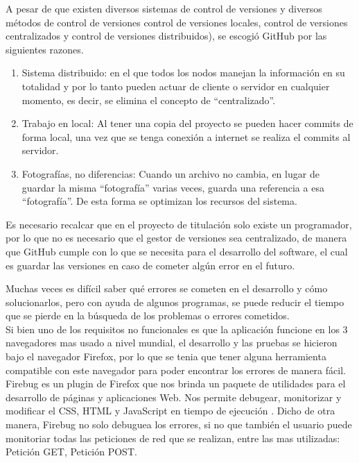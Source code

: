 	 A pesar de que existen diversos sistemas de control de versiones y diversos métodos  de control de versiones control de versiones locales, control de versiones centralizados y control de versiones distribuidos), se escogió GitHub por las siguientes razones.
	 
	 \begin{enumerate}
	 	\item Sistema distribuido: en el que todos los nodos manejan la información en su totalidad y por lo tanto pueden actuar de cliente o servidor en cualquier momento, es decir, se elimina el concepto de “centralizado”.
	 	
	 	\item Trabajo en local: Al tener una copia del proyecto se pueden hacer commits de forma local, una vez que se tenga conexión a internet se realiza el commits al servidor.
	 	
	 	\item Fotografías, no diferencias: Cuando un archivo no cambia, en lugar de guardar la misma “fotografía” varias veces, guarda una referencia a esa “fotografía”. De esta forma se optimizan los recursos del sistema. 
	 	
	 \end{enumerate}
	 
	 Es necesario recalcar que en  el proyecto de titulación solo existe un programador, por lo que  no es necesario que el gestor de versiones sea centralizado, de manera que  GitHub cumple con lo que se necesita para el desarrollo del software, el cual es guardar las versiones en caso de cometer algún error en el futuro.
	 
	
	Muchas veces es difícil saber qué errores se cometen en el desarrollo y cómo solucionarlos, pero con ayuda de algunos programas, se puede reducir el tiempo que se pierde en la búsqueda de los problemas o errores cometidos. 
	\\

	Si bien uno de los requisitos no funcionales es que la aplicación funcione en los 3 navegadores mas usado a nivel mundial, el desarrollo y las pruebas se  hicieron bajo el navegador Firefox, por lo que se tenia que tener alguna herramienta compatible con este navegador para poder encontrar los errores de manera fácil.
	\\
	
	Firebug es un plugin de Firefox que nos brinda un paquete de utilidades para el desarrollo de páginas y aplicaciones Web. Nos permite debugear, monitorizar y modificar el CSS, HTML y JavaScript en tiempo de ejecución \cite{moz15}. Dicho de otra manera, Firebug no solo debuguea los errores, si no que también el usuario puede monitoriar todas las  peticiones de red que se realizan, entre las mas utilizadas: Petición GET, Petición POST.
	
